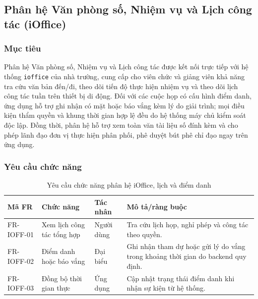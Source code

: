 \subsection{Phân hệ Văn phòng số, Nhiệm vụ và Lịch công tác (iOffice)}
\label{subsec:module_ioffice}
\label{subsec:req_ioffice}
\label{subsec:req_schedule}

\subsubsection{Mục tiêu}
Phân hệ Văn phòng số, Nhiệm vụ và Lịch công tác được kết nối trực tiếp với hệ thống \texttt{ioffice} của nhà trường, cung cấp cho viên chức và giảng viên khả năng tra cứu văn bản đến/đi, theo dõi tiến độ thực hiện nhiệm vụ và theo dõi lịch công tác tuần trên thiết bị di động. Đối với các cuộc họp có cấu hình điểm danh, ứng dụng hỗ trợ ghi nhận có mặt hoặc báo vắng kèm lý do giải trình; mọi điều kiện thẩm quyền và khung thời gian hợp lệ đều do hệ thống máy chủ kiểm soát độc lập. Đồng thời, phân hệ hỗ trợ xem toàn văn tài liệu số đính kèm và cho phép lãnh đạo đơn vị thực hiện phân phối, phê duyệt bút phê chỉ đạo ngay trên ứng dụng.

\subsubsection{Yêu cầu chức năng}

\begin{table}[H]
\centering
\small
\caption{Yêu cầu chức năng phân hệ iOffice, lịch và điểm danh}
\label{tab:fr_ioffice}
\begin{tabularx}{\textwidth}{|L{1.8cm}|L{3.0cm}|L{2.3cm}|Y|}
\hline
\textbf{Mã FR} & \textbf{Chức năng} & \textbf{Tác nhân} & \textbf{Mô tả/ràng buộc} \\
\hline
FR-IOFF-01 & Xem lịch công tác tổng hợp & Người dùng & Tra cứu lịch họp, nghỉ phép và công tác theo quyền. \\
\hline
FR-IOFF-02 & Điểm danh hoặc báo vắng & Đại biểu & Ghi nhận tham dự hoặc gửi lý do vắng trong khoảng thời gian do backend quy định. \\
\hline
FR-IOFF-03 & Đồng bộ thời gian thực & Ứng dụng & Cập nhật trạng thái điểm danh khi nhận sự kiện từ hệ thống. \\
\hline
\end{tabularx}
\end{table}

